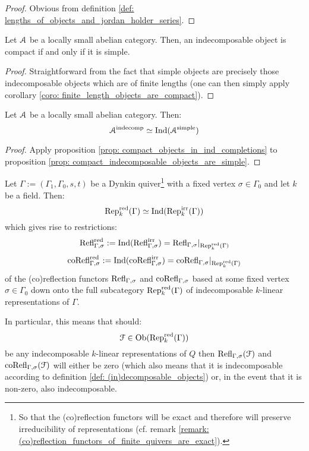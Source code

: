                 \begin{proof}
                    Obvious from definition \ref{def: lengths_of_objects_and_jordan_holder_series}.
                \end{proof}
            \begin{proposition} \label{prop: compact_indecomposable_objects_are_simple}
                Let $\mathcal{A}$ be a locally small abelian category. Then, an indecomposable object is compact if and only if it is simple.
            \end{proposition}
                \begin{proof}
                    Straightforward from the fact that simple objects are precisely those indecomposable objects which are of finite lengths (one can then simply apply corollary \ref{coro: finite_length_objects_are_compact}). 
                \end{proof}
            \begin{corollary}
                Let $\mathcal{A}$ be a locally small abelian category. Then:
                    $$\mathcal{A}^{\mathrm{indecomp}} \simeq \mathrm{Ind}(\mathcal{A}^{\mathrm{simple}})$$
            \end{corollary}
                \begin{proof}
                    Apply proposition \ref{prop: compact_objects_in_ind_completions} to proposition \ref{prop: compact_indecomposable_objects_are_simple}.
                \end{proof}
            \begin{corollary} \label{coro: (co)reflections_of_indecomposable_representations_of_dynkin_quivers}
                Let $\Gamma := (\Gamma_1, \Gamma_0, s, t)$ be a Dynkin quiver\footnote{So that the (co)reflection functors will be exact and therefore will preserve irreducibility of representations (cf. remark \ref{remark: (co)reflection_functors_of_finite_quivers_are_exact}).} with a fixed vertex $\sigma \in \Gamma_0$ and let $k$ be a field. Then:
                    $$\mathrm{Rep}_k^{\mathrm{red}}(\Gamma) \simeq \mathrm{Ind}( \mathrm{Rep}_k^{\mathrm{irr}}(\Gamma) )$$
                which gives rise to restrictions:
                    $$\mathrm{Refl}_{\Gamma, \sigma}^{\mathrm{red}} := \mathrm{Ind}(\mathrm{Refl}_{\Gamma, \sigma}^{\mathrm{irr}}) = \mathrm{Refl}_{\Gamma, \sigma}|_{\mathrm{Rep}_k^{\mathrm{red}}(\Gamma)}$$
                    $$\mathrm{co}\mathrm{Refl}_{\Gamma, \sigma}^{\mathrm{red}} := \mathrm{Ind}(\mathrm{co}\mathrm{Refl}_{\Gamma, \sigma}^{\mathrm{irr}}) = \mathrm{co}\mathrm{Refl}_{\Gamma, \sigma}|_{\mathrm{Rep}_k^{\mathrm{red}}(\Gamma)}$$
                of the (co)reflection functors $\mathrm{Refl}_{\Gamma, \sigma}$ and $\mathrm{co}\mathrm{Refl}_{\Gamma, \sigma}$ based at some fixed vertex $\sigma \in \Gamma_0$ down onto the full subcategory $\mathrm{Rep}_k^{\mathrm{red}}(\Gamma)$ of indecomposable $k$-linear representations of $\Gamma$. 
                
                In particular, this means that should:
                    $$\mathcal{F} \in \mathrm{Ob}(\mathrm{Rep}_k^{\mathrm{red}}(\Gamma))$$
                be any indecomposable $k$-linear representations of $Q$ then $\mathrm{Refl}_{\Gamma, \sigma}(\mathcal{F})$ and $\mathrm{co}\mathrm{Refl}_{\Gamma, \sigma}(\mathcal{F})$ will either be zero (which also means that it is indecomposable according to definition \ref{def: (in)decomposable_objects}) or, in the event that it is non-zero, also indecomposable.
            \end{corollary}
